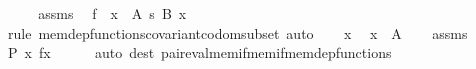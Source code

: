 \begin{isabellebody}
%
\isadelimproof
%
\endisadelimproof
%
\isatagproof
{}\isamarkupfalse%
\ {\isacharminus}{\kern0pt}\isanewline
\ \ \isamarkupfalse%
\ assms\ \isamarkupfalse%
\ {\isachardoublequoteopen}f\ {\isasymin}\ {\isacharparenleft}{\kern0pt}x\ {\isasymin}\ A{\isacharparenright}{\kern0pt}\ {\isasymrightarrow}s\ {\isacharparenleft}{\kern0pt}B\ x{\isacharparenright}{\kern0pt}{\isachardoublequoteclose}\isanewline
\ \ \ \ \isamarkupfalse%
\ {\isacharparenleft}{\kern0pt}rule\ mem{\isacharunderscore}{\kern0pt}dep{\isacharunderscore}{\kern0pt}functions{\isacharunderscore}{\kern0pt}covariant{\isacharunderscore}{\kern0pt}codom{\isacharunderscore}{\kern0pt}subset{\isacharparenright}{\kern0pt}\ auto\isanewline
\ \ \isamarkupfalse%
\ x\ \isamarkupfalse%
\ {\isachardoublequoteopen}x\ {\isasymin}\ A{\isachardoublequoteclose}\isanewline
\ \ \isamarkupfalse%
\ assms\ \isamarkupfalse%
\ {\isachardoublequoteopen}P\ x\ {\isacharparenleft}{\kern0pt}f{\isacharbackquote}{\kern0pt}x{\isacharparenright}{\kern0pt}{\isachardoublequoteclose}\isanewline
\ \ \ \ \isamarkupfalse%
\ {\isacharparenleft}{\kern0pt}auto\ dest{\isacharcolon}{\kern0pt}\ pair{\isacharunderscore}{\kern0pt}eval{\isacharunderscore}{\kern0pt}mem{\isacharunderscore}{\kern0pt}if{\isacharunderscore}{\kern0pt}mem{\isacharunderscore}{\kern0pt}if{\isacharunderscore}{\kern0pt}mem{\isacharunderscore}{\kern0pt}dep{\isacharunderscore}{\kern0pt}functions{\isacharparenright}{\kern0pt}\isanewline
{}\isamarkupfalse%
%
\endisatagproof
{\isafoldproof}%
%
\isadelimproof
\isanewline
%
\endisadelimproof
\isanewline
%
\isadelimtheory
\isanewline
%
\endisadelimtheory
%
\isatagtheory
{}\isamarkupfalse%
%
\endisatagtheory
{\isafoldtheory}%
%
\isadelimtheory
%
\endisadelimtheory
%
\end{isabellebody}%
\endinput
